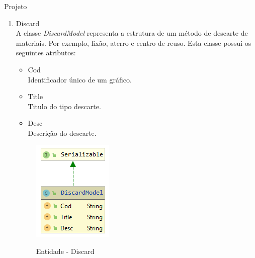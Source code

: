 \documentclass[
	12pt,				%
	openany,			%
	twoside,			%
	a4paper,			%
	english,			%
	french,				%
	spanish,			%
	brazil				%
	]{abntex2}
\begin{document}
\begin{chapter}{Projeto}
\begin{enumerate}
  \item{Discard}   \\ A classe \textit{DiscardModel} representa a estrutura de um método de descarte de materiais. Por exemplo, lixão, aterro e centro de reuso. Esta classe possui os seguintes atributos:
  
  \begin{itemize}
  \item{Cod}\\ Identificador único de um gráfico.
       \item{Title}\\Titulo do tipo descarte.
         \item{Desc}\\ Descrição do descarte.
  
    
\end{itemize}
  
\begin{figure}[h]
\centering
   \caption{Entidade - Discard}
   \includegraphics[scale=1.0]{media/discardModel.png}
     \label{fig:discardModel}
\end{figure}


\end{enumerate}
\end{chapter}
\end{document}
